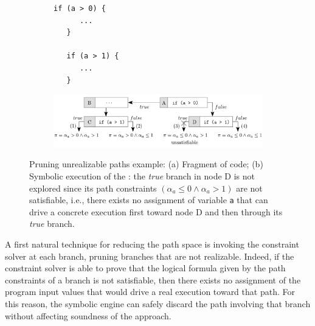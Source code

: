 \begin{figure}[t]
  \begin{subfigure}{.29\textwidth}
    \vspace{0mm}
    \begin{lstlisting}[basicstyle=\ttfamily\scriptsize]
   if (a > 0) {
      ...
   } 

   if (a > 1) {
      ...
   }
    \end{lstlisting}
    \vspace{-0.7mm}
    \caption{}
  \end{subfigure}%
  \begin{subfigure}{.70\textwidth}
    \centering
    \includegraphics[width=1.0\columnwidth]{images/eager-evaluation} 
    \vspace{-5mm}
    \caption{}
  \end{subfigure}%
  \vspace{-2mm}
  \caption{Pruning unrealizable paths example: (a) Fragment of code; (b) Symbolic execution of the : the {\em true} branch in node D is not explored since its path constraints $(\alpha_a \leq 0 \wedge \alpha_a > 1)$ are not satisfiable, i.e., there exists no assignment of variable {\tt a} that can drive a concrete execution first toward node D and then through its {\em true} branch.}
  \label{fig:eager-evaluation}
\end{figure}

A first natural technique for reducing the path space is invoking the constraint solver at each branch, pruning branches that are not realizable. Indeed, if the constraint solver is able to prove that the logical formula given by the path constraints of a branch is not satisfiable, then there exists no assignment of the program input values that would drive a real execution toward that path. For this reason, the symbolic engine can safely discard the path involving that branch without affecting soundness of the approach. 

